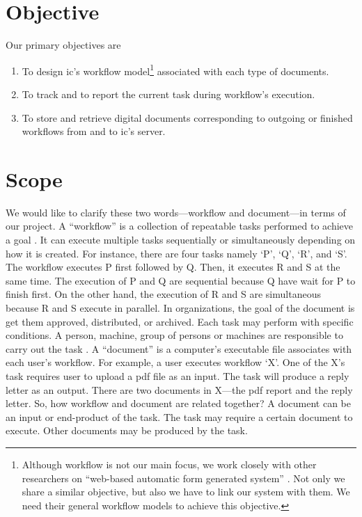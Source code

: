 \section{Objective}
Our primary objectives are
\begin{enumerate}
\item To design \gls{ic}'s workflow model\footnote{
	Although workflow is not our main focus, we work closely with other researchers on \enquote{web-based automatic form generated system} \cite{web-based-form}.
	Not only we share a similar objective, but also we have to link our system with them.
	We need their general workflow models to achieve this objective.
} associated with each type of documents.
\item To track and to report the current task during workflow's execution.
\item To store and retrieve digital documents corresponding to outgoing or finished workflows from and to \gls{ic}'s server.
\end{enumerate}

\section{Scope}
We would like to clarify these two words---workflow and document---in terms of our project. %
A \enquote{workflow} is a collection of repeatable tasks performed to achieve a goal \cite{Jablonski:1996:WMM}.
It can execute multiple tasks sequentially or simultaneously depending on how it is created.
For instance, there are four tasks namely \enquote*{P}, \enquote*{Q}, \enquote*{R}, and \enquote*{S}.
The workflow executes P first followed by Q.
Then, it executes R and S at the same time.
The execution of P and Q are sequential because Q have wait for P to finish first.
On the other hand, the execution of R and S are simultaneous because R and S execute in parallel.
In organizations, the goal of the document is get them approved, distributed, or archived.
Each task may perform with specific conditions.
A person, machine, group of persons or machines are responsible to carry out the task \cite{wfMangement}. 
A \enquote{document} is a computer's executable file associates with each user's workflow.
For example, a user executes workflow \enquote*{X}.
One of the X's task requires user to upload a \gls{pdf} file as an input.
The task will produce a reply letter as an output.
There are two documents in X---the \gls{pdf} report and the reply letter.
So, how workflow and document are related together?
A document can be an input or end-product of the task.
The task may require a certain document to execute.
Other documents may be produced by the task.


